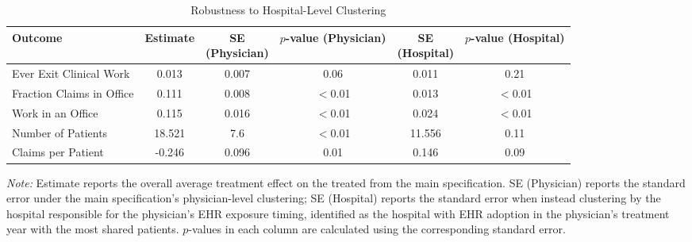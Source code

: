 \begin{table}[ht!]
\centering
\caption{\label{tab:cluster_robustness}Robustness to Hospital-Level Clustering}
\begin{threeparttable}
\begin{tabular}{lccccc}
\toprule
Outcome & Estimate & \makecell{SE\\(Physician)} & \makecell{$p$-value\\(Physician)} & \makecell{SE\\(Hospital)} & \makecell{$p$-value\\(Hospital)}\\
\midrule
Ever Exit Clinical Work & 0.013 & 0.007 & 0.06 & 0.011 & 0.21\\
Fraction Claims in Office & 0.111 & 0.008 & $<$0.01 & 0.013 & $<$0.01\\
Work in an Office & 0.115 & 0.016 & $<$0.01 & 0.024 & $<$0.01\\
Number of Patients & 18.521 & 7.6 & $<$0.01 & 11.556 & 0.11\\
Claims per Patient & -0.246 & 0.096 & 0.01 & 0.146 & 0.09\\
\bottomrule
\end{tabular}
\begin{tablenotes}
\item \textit{Note: } Estimate reports the overall average treatment effect on the treated from the main specification. SE (Physician) reports the standard error under the main specification's physician-level clustering; SE (Hospital) reports the standard error when instead clustering by the hospital responsible for the physician's EHR exposure timing, identified as the hospital with EHR adoption in the physician's treatment year with the most shared patients. $p$-values in each column are calculated using the corresponding standard error.
\end{tablenotes}
\end{threeparttable}
\end{table}